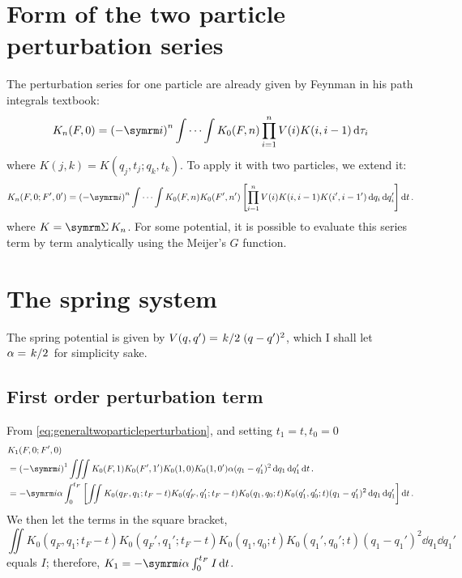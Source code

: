 \section{Form of the two particle perturbation series}

The perturbation series for one particle are already given by Feynman in his path integrals textbook:
\begin{equation}
    K_n(F, 0) = \left(-\im\right)^n\idotsint K_0(F, n)\prod_{i = 1}^n V(i)K(i, i - 1)\dd{\tau_i}
\end{equation}
where $K(j, k) = K(q_j, t_j; q_k, t_k)$. To apply it with two particles, we extend it:
\begin{equation}
    K_n(F, 0; F', 0') = \left(-\im\right)^n\idotsint K_0(F, n)K_0(F', n')\left[\prod_{i = 1}^nV(i)K(i, i - 1)K(i', i - 1')\dd{q_i}\dd{q_i'}\right]\dd{t}. \label{eq:generaltwoparticleperturbation}
\end{equation}
where $K = \ssum K_n$. For some potential, it is possible to evaluate this series term by term analytically using the Meijer's $G$ function.

\section{The spring system}

The spring potential is given by $V(q, q') = \flatfrac{k}{2}(q - q')^2$, which I shall let $\alpha = \flatfrac{k}{2}$ for simplicity sake.

\subsection{First order perturbation term}
\label{sec:spring_1storder}

From \cref{eq:generaltwoparticleperturbation}, and setting $t_1 = t, t_0 = 0$
\begin{align}
    &K_1(F, 0; F', 0) \nonumber \\
    &= \left(-\im\right)^1\iiint K_0(F, 1)K_0(F', 1')K_0(1, 0)K_0(1, 0')\alpha(q_1 - q_1')^2\dd{q_1}\dd{q_1'}\dd{t}. \\
    &= -\im\alpha\int_0^{t_F}\left[\iint K_0(q_F, q_1; t_F - t)K_0(q_F', q_1'; t_F - t)K_0(q_1, q_0; t)K_0(q_1', q_0'; t)(q_1 - q_1')^2\dd{q_1}\dd{q_1'}\right]\dd{t}. \nonumber
\end{align}
We then let the terms in the square bracket,
\begin{equation}
    \iint K_0(q_F, q_1; t_F - t)K_0(q_F', q_1'; t_F - t)K_0(q_1, q_0; t)K_0(q_1', q_0'; t)(q_1 - q_1')^2\dd{q_1}\dd{q_1'}
\end{equation}
equals $I$; therefore, $K_1 = -\im\alpha\int_0^{t_F} I\dd{t}$.

